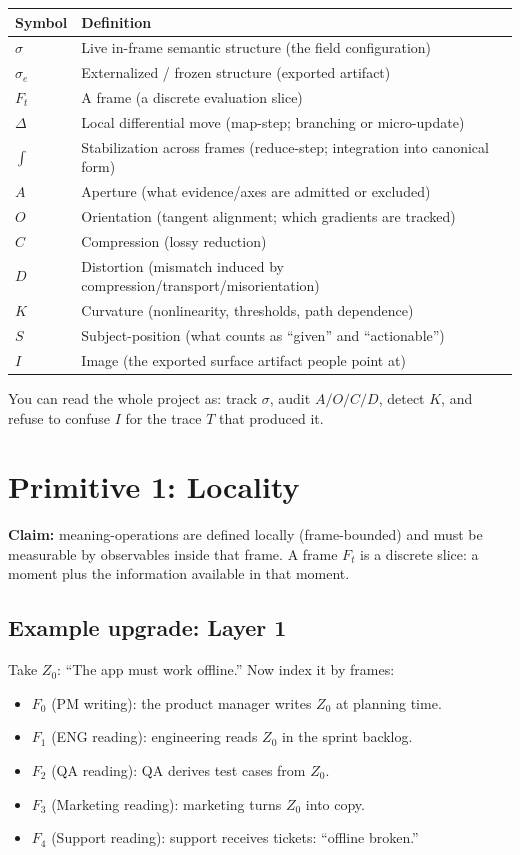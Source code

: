 \documentclass[11pt]{article}
\begin{document}
\begin{center}
\begin{tabular}{@{}ll@{}}
\toprule
Symbol & Definition \\
\midrule
$\sigma$ & Live in-frame semantic structure (the field configuration) \\
$\sigma_e$ & Externalized / frozen structure (exported artifact) \\
$F_t$ & A frame (a discrete evaluation slice) \\
$\Delta$ & Local differential move (map-step; branching or micro-update) \\
$\int$ & Stabilization across frames (reduce-step; integration into canonical form) \\
$A$ & Aperture (what evidence/axes are admitted or excluded) \\
$O$ & Orientation (tangent alignment; which gradients are tracked) \\
$C$ & Compression (lossy reduction) \\
$D$ & Distortion (mismatch induced by compression/transport/misorientation) \\
$K$ & Curvature (nonlinearity, thresholds, path dependence) \\
$S$ & Subject-position (what counts as ``given'' and ``actionable'') \\
$I$ & Image (the exported surface artifact people point at) \\
\bottomrule
\end{tabular}
\end{center}

You can read the whole project as: track $\sigma$, audit $A/O/C/D$, detect $K$, and refuse to confuse $I$ for the trace $T$ that produced it.

\section{Primitive 1: Locality}

\textbf{Claim:} meaning-operations are defined locally (frame-bounded) and must be measurable by observables inside that frame. A frame $F_t$ is a discrete slice: a moment plus the information available in that moment.

\subsection{Example upgrade: Layer 1}

Take $Z_0$: ``The app must work offline.'' Now index it by frames:
\begin{itemize}[leftmargin=2em]
  \item $F_0$ (PM writing): the product manager writes $Z_0$ at planning time.
  \item $F_1$ (ENG reading): engineering reads $Z_0$ in the sprint backlog.
  \item $F_2$ (QA reading): QA derives test cases from $Z_0$.
  \item $F_3$ (Marketing reading): marketing turns $Z_0$ into copy.
  \item $F_4$ (Support reading): support receives tickets: ``offline broken.''
\end{itemize}
\end{document}
